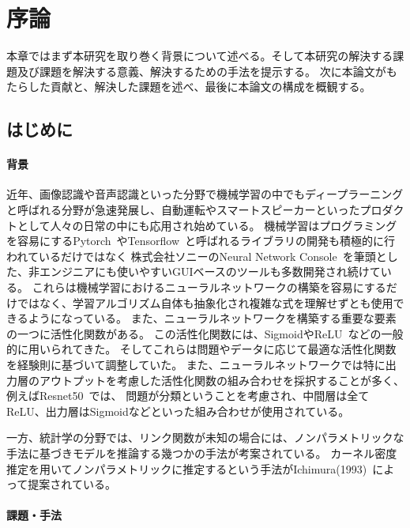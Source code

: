 \chapter{序論}
\label{introduction}

本章ではまず本研究を取り巻く背景について述べる。そして本研究の解決する課題及び課題を解決する意義、解決するための手法を提示する。
次に本論文がもたらした貢献と、解決した課題を述べ、最後に本論文の構成を概観する。

\section{はじめに}
\label{introduction:background}

\subsubsection{背景}


近年、画像認識や音声認識といった分野で機械学習の中でもディープラーニングと呼ばれる分野が急速発展し、自動運転やスマートスピーカーといったプロダクトとして人々の日常の中にも応用され始めている。
機械学習はプログラミングを容易にするPytorch~\cite{pytorch}やTensorflow~\cite{tensorflow}と呼ばれるライブラリの開発も積極的に行われているだけではなく
株式会社ソニーのNeural Network Console~\cite{sony}を筆頭とした、非エンジニアにも使いやすいGUIベースのツールも多数開発され続けている。
これらは機械学習におけるニューラルネットワークの構築を容易にするだけではなく、学習アルゴリズム自体も抽象化され複雑な式を理解せずとも使用できるようになっている。
また、ニューラルネットワークを構築する重要な要素の一つに活性化関数がある。
この活性化関数には、SigmoidやReLU~\cite{ReLU}などの一般的に用いられてきた。
そしてこれらは問題やデータに応じて最適な活性化関数を経験則に基づいて調整していた。
また、ニューラルネットワークでは特に出力層のアウトプットを考慮した活性化関数の組み合わせを採択することが多く、例えばResnet50~\cite{resnet50}では、
問題が分類ということを考慮され、中間層は全てReLU、出力層はSigmoidなどといった組み合わせが使用されている。

一方、統計学の分野では、リンク関数が未知の場合には、ノンパラメトリックな手法に基づきモデルを推論する幾つかの手法が考案されている。
カーネル密度推定を用いてノンパラメトリックに推定するという手法がIchimura(1993)~\cite{ichimura}によって提案されている。

\subsubsection{課題・手法}

